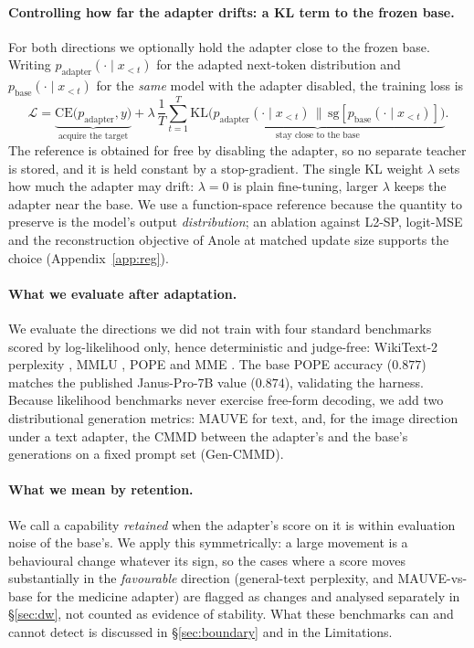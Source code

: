 \documentclass{article}
\begin{document}
\paragraph{Controlling how far the adapter drifts: a KL term to the frozen base.}
For both directions we optionally hold the adapter close to the frozen base.
Writing $p_{\text{adapter}}(\cdot\mid x_{<t})$ for the adapted next-token
distribution and $p_{\text{base}}(\cdot\mid x_{<t})$ for the \emph{same} model
with the adapter disabled, the training loss is
\begin{equation}
\mathcal{L}=\underbrace{\mathrm{CE}\big(p_{\text{adapter}},y\big)}_{\text{acquire the target}}
+\lambda\,\frac{1}{T}\sum_{t=1}^{T}\underbrace{\mathrm{KL}\!\big(p_{\text{adapter}}(\cdot\mid x_{<t})\,\big\|\,\mathrm{sg}[p_{\text{base}}(\cdot\mid x_{<t})]\big)}_{\text{stay close to the base}} .
\label{eq:kl}
\end{equation}
The reference is obtained for free by disabling the adapter, so no separate
teacher is stored, and it is held constant by a stop-gradient. The single KL
weight $\lambda$ sets how much the adapter may drift: $\lambda=0$ is plain
fine-tuning, larger $\lambda$ keeps the adapter near the base. We use a
function-space reference because the quantity to preserve is the model's output
\emph{distribution}; an ablation against L2-SP, logit-MSE and the reconstruction
objective of Anole \citep{chern2024anole} at matched update size supports the
choice (Appendix~\ref{app:reg}).

\paragraph{What we evaluate after adaptation.}
We evaluate the directions we did not train with four standard benchmarks scored
by log-likelihood only, hence deterministic and judge-free: WikiText-2 perplexity
\citep{wikitext}, MMLU \citep{mmlu}, POPE \citep{pope} and MME \citep{mme}. The
base POPE accuracy ($0.877$) matches the published Janus-Pro-7B value ($0.874$),
validating the harness. Because likelihood benchmarks never exercise free-form
decoding, we add two distributional generation metrics: MAUVE
\citep{pillutla2021mauve} for text, and, for the image direction under a text
adapter, the CMMD \citep{cmmd} between the adapter's and the base's generations
on a fixed prompt set (Gen-CMMD).

\paragraph{What we mean by retention.}
We call a capability \emph{retained} when the adapter's score on it is within
evaluation noise of the base's. We apply this symmetrically: a large movement is
a behavioural change whatever its sign, so the cases where a score moves
substantially in the \emph{favourable} direction (general-text perplexity, and
MAUVE-vs-base for the medicine adapter) are flagged as changes and analysed
separately in \S\ref{sec:dw}, not counted as evidence of stability. What these
benchmarks can and cannot detect is discussed in \S\ref{sec:boundary} and in the
Limitations.
\end{document}
